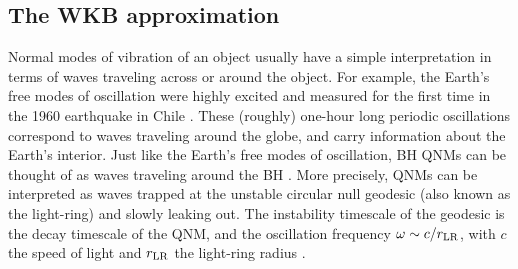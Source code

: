 \documentclass[]{iopart}
\begin{document}
\subsection{\label{sec:wkb}The WKB approximation}

Normal modes of vibration of an object usually have a simple interpretation in
terms of waves traveling across or around the object. For example, the Earth's
free modes of oscillation were highly excited and measured for the first time
in the 1960 earthquake in Chile \cite{seismicbook}.  These (roughly) one-hour
long periodic oscillations correspond to waves traveling around the globe, and
carry information about the Earth's interior.  Just like the Earth's free
modes of oscillation, BH QNMs can be thought of as waves traveling around the
BH \cite{pressringdown,goebel,Ferrari:1984zz,mashhoon,stewart,Decanini:2002ha,
  Cardoso:2008bp,Decanini:2009mu}.  More precisely, QNMs can be interpreted as waves
trapped at the unstable circular null geodesic (also known as the light-ring)
and slowly leaking out. The instability timescale of the geodesic is the decay
timescale of the QNM, and the oscillation frequency $\omega\sim c/r_{\rm LR}$,
with $c$ the speed of light and $r_{\rm LR}$ the light-ring radius
\cite{Cardoso:2008bp}.
\end{document}
